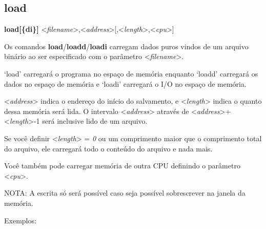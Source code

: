 \documentclass[letterpaper,10pt,brazil]{sphinxmanual}
\begin{document}
\begin{quote}
\label{debugger/memory:debugger-command-load}\end{quote}


\subsection{load}
\label{debugger/memory:load}\label{debugger/memory:debugger-command-load}
\begin{DUlineblock}{0em}
\item[]
\begin{DUlineblock}{\DUlineblockindent}
\item[] \textbf{load{[}\{d\textbar{}i\}{]}} \textless{}\emph{filename}\textgreater{},\textless{}\emph{address}\textgreater{}{[},\textless{}\emph{length}\textgreater{},\textless{}\emph{cpu}\textgreater{}{]}
\item[] 
\end{DUlineblock}
\item[] Os comandos \textbf{load}/\textbf{loadd}/\textbf{loadi} carregam dados puros vindos de um arquivo binário ao ser especificado com o parâmetro \textless{}\emph{filename}\textgreater{}.
\item[] `load' carregará o programa no espaço de memória enquanto `loadd' carregará os dados no espaço de memória e `loadi' carregará o I/O no espaço de memória.
\item[] \textless{}\emph{address}\textgreater{} indica o endereço do início do salvamento, e \textless{}\emph{length}\textgreater{} indica o quanto dessa memória será lida. O intervalo \textless{}\emph{address}\textgreater{} através de \textless{}\emph{address}\textgreater{}+\textless{}\emph{length}\textgreater{}-1 será inclusive lido de um arquivo.
\item[] Se você definir \textless{}\emph{length}\textgreater{} = \emph{0} ou um comprimento maior que o comprimento total do arquivo, ele carregará todo o conteúdo do arquivo e nada mais.
\item[] Você também pode carregar memória de outra CPU definindo o parâmetro \textless{}\emph{cpu}\textgreater{}.
\item[] 
\item[] NOTA: A escrita só será possível caso seja possível sobrescrever na janela da memória.
\item[] 
\item[] 
\item[] Exemplos:
\item[] 

\end{DUlineblock}
\end{document}
